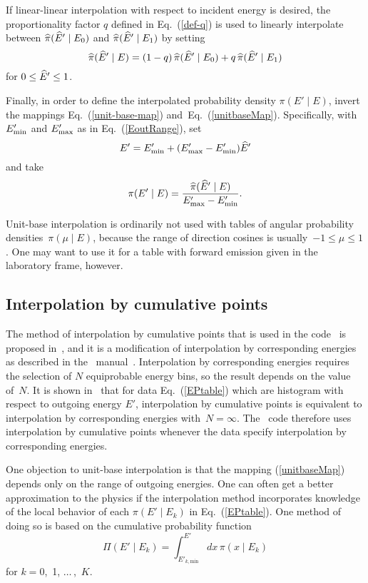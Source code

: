 If linear-linear interpolation with respect to incident energy is
desired, the proportionality factor $q$ defined in
Eq.~(\ref{def-q}) is used to linearly interpolate between
$\widehat \pi(\widehat E' \mid E_0)$ and $\widehat \pi(\widehat E' \mid E_1)$
by setting
\begin{equation}
  \widehat \pi(\widehat E' \mid E) = (1 - q)\,\widehat \pi(\widehat E' \mid E_0) +
   q \,\widehat \pi(\widehat E' \mid E_1)
 \label{unitbaseInterp}
\end{equation}
for $0 \le \widehat E' \le 1$. 

Finally, in order to define the interpolated probability
density $\pi(E' \mid E)$, invert the mappings Eq.~(\ref{unit-base-map})
and~Eq.~(\ref{unitbaseMap}).  Specifically, with $E_{\text{min}}'$ and
$E_{\text{max}}'$ as in Eq.~(\ref{EoutRange}), set
\begin{equation}
   E' = E_{\text{min}}' + ( E_{\text{max}}' - E_{\text{min}}')\widehat E'
 \label{range-inv}
\end{equation}
and take
\begin{equation}
  \pi(E' \mid E) = \frac{\widehat \pi(\widehat E' \mid E)}{ E_{\text{max}}' - E_{\text{min}}' }.
 \label{unitbaseInvert}
\end{equation}

Unit-base interpolation is ordinarily not used with tables of
angular probability densities~$\pi( \mu \mid E)$, because the
range of direction cosines is usually~$-1 \le \mu \le 1$.  One
may want to use it for a table with forward emission given in
the laboratory frame, however.

\subsection{Interpolation by cumulative points}\label{Sec:cumProb}
The method of interpolation by cumulative points that is
used in the code \gettransfer\ is proposed in~\cite{interpolation},
and it is a modification of interpolation by corresponding energies as described
in the \ENDF\ manual~\cite{ENDFB}.  
Interpolation by corresponding energies requires the selection of
$N$ equiprobable energy bins, so the result depends on the value of~$N$.
It is shown in~\cite{interpolation} that for data Eq.~(\ref{EPtable}) which are
histogram with respect to outgoing energy $E'$, interpolation by cumulative 
points is equivalent to interpolation by corresponding energies with~$N = \infty$.
The \gettransfer\ code therefore uses interpolation by cumulative points
whenever the data specify interpolation by corresponding energies.

One objection to unit-base interpolation is that the mapping
(\ref{unitbaseMap}) depends only
on the range of outgoing energies.
One can often get a better approximation to the physics if the
interpolation method incorporates
knowledge of the local behavior of each $\pi( E' \mid E_k)$
in Eq.~(\ref{EPtable}).
One method of doing so is based on the cumulative
probability function
\begin{equation}
  \Pi( E' \mid E_k) = \int_{E'_{k,\text{min}}}^{E'} dx\, \pi( x \mid E_k)
  \label{cumProb}
\end{equation}
for $k = 0$,~1, $\ldots\,$,~$K$.

